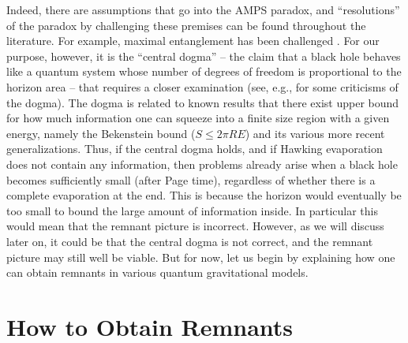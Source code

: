 \documentclass[preprintnumbers, floatfix, preprintnumbers, letterpaper, twocolumn, superscriptaddress,nofootinbib]{revtex4-2}
\begin{document}
Indeed, there are assumptions that go into the AMPS paradox, and ``resolutions'' of the paradox by challenging these premises can be found throughout the literature. For example, maximal entanglement has been challenged \cite{1908.01005,2409.05051}. For our purpose, however, it is the ``central dogma'' \cite{2006.06872} -- the claim that a black hole behaves like a quantum
system whose number of degrees of freedom is proportional to the horizon area -- that requires a closer examination (see, e.g., \cite{2107.05662} for some criticisms of the dogma). The dogma is related to known results that there exist upper bound for how much information one can squeeze into a finite size region with a given energy, namely the Bekenstein bound \cite{bek} ($S \leqslant 2\pi R E$) and its various more recent generalizations.   
Thus, if the central dogma holds, and if Hawking evaporation does not contain any information, then problems already arise when a black hole becomes sufficiently small (after Page time), regardless of whether there is a complete evaporation at the end. This is because the horizon would eventually be too small to bound the large amount of information inside. In particular this would mean that the remnant picture is incorrect. However, as we will discuss later on, it could be that the central dogma is not correct, and the remnant picture may still well be viable. But for now, let us begin by explaining how one can obtain remnants in various quantum gravitational models.

\section{How to Obtain Remnants}
\end{document}
